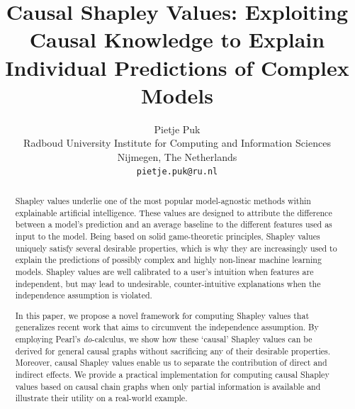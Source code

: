 \documentclass{article}
\title{Causal Shapley Values: Exploiting Causal Knowledge to Explain Individual Predictions of Complex Models}
\author{%
  Pietje Puk\\
  Radboud University
  Institute for Computing and Information Sciences\\
  Nijmegen, The Netherlands \\
  \texttt{pietje.puk@ru.nl} \\
}
\begin{document}
\maketitle

\begin{abstract}
Shapley values underlie one of the most popular model-agnostic methods within explainable artificial intelligence. These values are designed to attribute the difference between a model's prediction and an average baseline to the different features used as input to the model. Being based on solid game-theoretic principles, Shapley values uniquely satisfy several desirable properties, which is why they are increasingly used to explain the predictions of possibly complex and highly non-linear machine learning models. Shapley values are well calibrated to a user’s intuition when features are independent, but may lead to undesirable, counter-intuitive explanations when the independence assumption is violated.

In this paper, we propose a novel framework for computing Shapley values that generalizes recent work that aims to circumvent the independence assumption. By employing Pearl's \textit{do}-calculus, we show how these `causal' Shapley values can be derived for general causal graphs without sacrificing any of their desirable properties. Moreover, causal Shapley values enable us to separate the contribution of direct and indirect effects. We provide a practical implementation for computing causal Shapley values based on causal chain graphs when only partial information is available and illustrate their utility on a real-world example.
\end{abstract}




\end{document}
